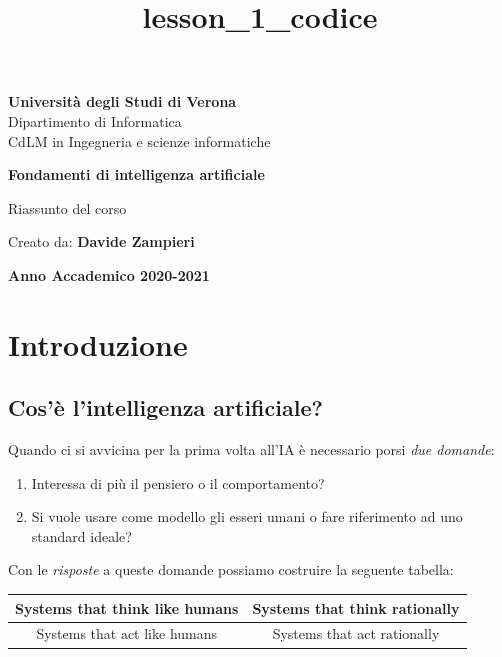 \documentclass[11pt,oneside]{book}
\title{lesson\_1\_codice}
\begin{document}
\begin{titlepage}
    \begin{center}
        
        \Large
        \textbf{Università degli Studi di Verona} \\
        Dipartimento di Informatica \\
        CdLM in Ingegneria e scienze informatiche
        
        \vspace{5cm}
        
        \Huge
        \textcolor{linkcolor}{\textbf{Fondamenti di intelligenza artificiale}}
        
        \vspace{0.5cm}
        \LARGE
        Riassunto del corso
        
        \vspace{5cm}
        
        Creato da: \textbf{Davide Zampieri}
        
        \vfill
        
        \Large
        \textbf{Anno Accademico 2020-2021}
        
    \end{center}
\end{titlepage}

\frontmatter
\tableofcontents
\lstlistoflistings

\mainmatter
\chapter{Introduzione}

\section{Cos'è l'intelligenza artificiale?}
Quando ci si avvicina per la prima volta all'IA è necessario porsi \textit{due domande}:
\begin{enumerate}
    \item Interessa di più il pensiero o il comportamento?
    \item Si vuole usare come modello gli esseri umani o fare riferimento ad uno standard ideale?
\end{enumerate}
Con le \textit{risposte} a queste domande possiamo costruire la seguente tabella:
\begin{center}
	\begin{tabular}{cc}
		\toprule
		Systems that think like humans & Systems that think rationally \\
		\midrule
		Systems that act like humans & Systems that act rationally \\
		\bottomrule
	\end{tabular}
\end{center}
\end{document}
